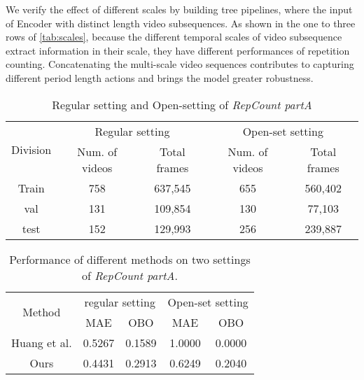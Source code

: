 \documentclass[10pt,twocolumn,letterpaper]{article}
\begin{document}
We verify the effect of different scales by building tree pipelines, where the input of Encoder  with distinct length video subsequences. As shown in the one to three rows of \cref{tab:scales}, because the different temporal scales of video subsequence extract information in their scale, they have different performances of repetition counting. Concatenating the multi-scale video sequences contributes to capturing different period length actions and brings the model greater robustness.
\begin{table*}[htbp]
\centering
\begin{tabular}{c|cc|cc}
\hline
\multirow{2}{*}{Division}  & \multicolumn{2}{c|}{Regular setting}   & \multicolumn{2}{c}{Open-set setting}               \\ \cline{2-5} 
                        & \multicolumn{1}{c|}{Num. of videos} & Total frames & \multicolumn{1}{c|}{Num. of videos} & Total frames \\ \cline{1-5} 
Train                   & \multicolumn{1}{c|}{758}            & 637,545             & \multicolumn{1}{c|}{655}            &   560,402          \\
val                     & \multicolumn{1}{c|}{131}            & 109,854             & \multicolumn{1}{c|}{130}            &   77,103      \\
test                    & \multicolumn{1}{c|}{152}            & 129,993             & \multicolumn{1}{c|}{256}            &   239,887      \\ \hline
\end{tabular}
\caption{
Regular setting and Open-setting of \emph{RepCount partA}
}
\label{tab:openset}
\end{table*}

\begin{table*}[ht]
\centering
\begin{tabular}{c|cccc}
\hline
\multirow{2}{*}{Method}  & \multicolumn{2}{c|}{regular setting} & \multicolumn{2}{c}{Open-set setting} \\ \cline{2-5} 
                        & MAE   & \multicolumn{1}{c|}{OBO }   & MAE             & OBO               \\ \hline
Huang et al. \cite{huang2020improving}   &  0.5267   & \multicolumn{1}{c|}{0.1589}    &    1.0000     &       0.0000           \\
Ours          & 0.4431  & \multicolumn{1}{c|}{0.2913}      &        0.6249 & 0.2040                  \\ \hline
\end{tabular}
\caption{
Performance of different methods on two settings of \emph{RepCount partA}.
}
\label{tab:reviewer3}
\end{table*}
\end{document}
